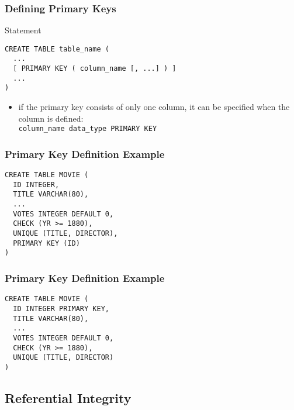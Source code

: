 \documentclass[dvipsnames]{beamer}
\theoremstyle{plain}
\begin{document}
\begin{frame}[fragile]
  \frametitle{Defining Primary Keys}

  \begin{block}{Statement}
    \begin{lstlisting}
CREATE TABLE table_name (
  ...
  [ PRIMARY KEY ( column_name [, ...] ) ]
  ...
)
    \end{lstlisting}
  \end{block}

  \begin{itemize}
    \item if the primary key consists of only one column, it can be specified
      when the column is defined:\\
      \lstinline!column_name data_type PRIMARY KEY!
  \end{itemize}
\end{frame}

\begin{frame}[fragile]
  \frametitle{Primary Key Definition Example}

  \begin{example}
    \begin{lstlisting}
CREATE TABLE MOVIE (
  ID INTEGER,
  TITLE VARCHAR(80),
  ...
  VOTES INTEGER DEFAULT 0,
  CHECK (YR >= 1880),
  UNIQUE (TITLE, DIRECTOR),
  PRIMARY KEY (ID)
)
    \end{lstlisting}
  \end{example}
\end{frame}

\begin{frame}[fragile]
  \frametitle{Primary Key Definition Example}

  \begin{example}
    \begin{lstlisting}
CREATE TABLE MOVIE (
  ID INTEGER PRIMARY KEY,
  TITLE VARCHAR(80),
  ...
  VOTES INTEGER DEFAULT 0,
  CHECK (YR >= 1880),
  UNIQUE (TITLE, DIRECTOR)
)
    \end{lstlisting}
  \end{example}
\end{frame}

\subsection{Referential Integrity}
\end{document}
